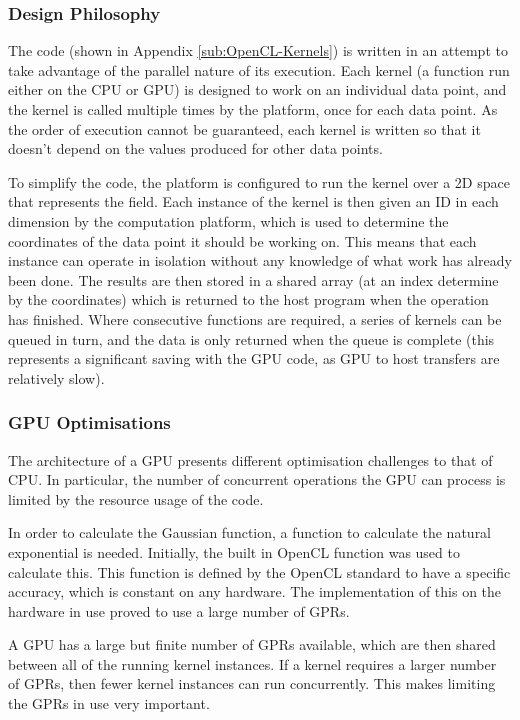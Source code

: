 \documentclass[10pt]{article}
\begin{document}
\subsubsection{Design Philosophy}

The code (shown in Appendix \ref{sub:OpenCL-Kernels}) is written in an attempt
to take advantage of the parallel nature of its execution. Each kernel (a
function run either on the CPU or GPU) is designed to work on an individual data
point, and the kernel is called multiple times by the platform, once for each
data point. As the order of execution cannot be guaranteed, each kernel is
written so that it doesn't depend on the values produced for other data points.

To simplify the code, the platform is configured to run the kernel over a 2D
space that represents the field. Each instance of the kernel is then given an ID
in each dimension by the computation platform, which is used to determine the
coordinates of the data point it should be working on. This means that each
instance can operate in isolation without any knowledge of what work has already
been done. The results are then stored in a shared array (at an index determine
by the coordinates) which is returned to the host program when the operation has
finished. Where consecutive functions are required, a series of kernels can be
queued in turn, and the data is only returned when the queue is complete (this
represents a significant saving with the GPU code, as GPU to host transfers are
relatively slow).

\subsubsection{GPU Optimisations}

The architecture of a GPU presents different optimisation challenges to that of
CPU. In particular, the number of concurrent operations the GPU can process is
limited by the resource usage of the code.

In order to calculate the Gaussian function, a function to calculate the natural
exponential is needed. Initially, the built in OpenCL function was used to
calculate this. This function is defined by the OpenCL standard to have a
specific accuracy, which is constant on any hardware. The implementation of this
on the hardware in use proved to use a large number of GPRs.

A GPU has a large but finite number of GPRs available, which are then shared
between all of the running kernel instances. If a kernel requires a larger
number of GPRs, then fewer kernel instances can run concurrently. This makes
limiting the GPRs in use very important.
\end{document}
